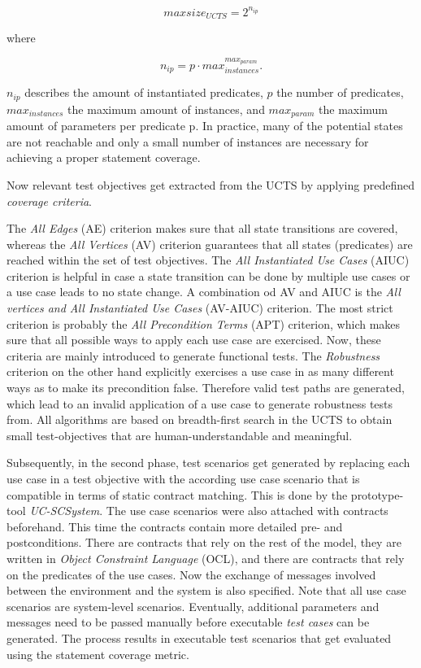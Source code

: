 \begin{equation}
	maxsize_{UCTS} = 2^{n_{ip}}
\end{equation}

where

\begin{equation}
	n_{ip} = p \cdot max_{instances}^{max_{param}}.
\end{equation}

$n_{ip}$ describes the amount of instantiated predicates, $p$ the number of predicates, $max_{instances}$ the maximum amount of instances, and $max_{param}$ the maximum amount of parameters per predicate p. In practice, many of the potential states are not reachable and only a small number of instances are necessary for achieving a proper statement coverage. 

Now relevant test objectives get extracted from the UCTS by applying predefined \textit{coverage criteria}. 

The \textit{All Edges} (AE) criterion makes sure that all state transitions are covered, whereas the \textit{All Vertices} (AV) criterion guarantees that all states (predicates) are reached within the set of test objectives.  The \textit{All Instantiated Use Cases} (AIUC) criterion is helpful in case a state transition can be done by multiple use cases or a use case leads to no state change. A combination od AV and AIUC is the \textit{All vertices and All Instantiated Use Cases} (AV-AIUC) criterion. The most strict criterion is probably the \textit{All Precondition Terms} (APT) criterion, which makes sure that all possible ways to apply each use case are exercised. Now, these criteria are mainly introduced to generate functional tests. The \textit{Robustness} criterion on the other hand explicitly exercises a use case in as many different ways as to make its precondition false. Therefore valid test paths are generated, which lead to an invalid application of a use case to generate robustness tests from. All algorithms are based on breadth-first search in the UCTS to obtain small test-objectives that are human-understandable and meaningful. 

Subsequently, in the second phase, test scenarios get generated by replacing each use case in a test objective with the according use case scenario that is compatible in terms of static contract matching. This is done by the prototype-tool \textit{UC-SCSystem}. The use case scenarios were also attached with contracts beforehand. This time the contracts contain more detailed pre- and postconditions. There are contracts that rely on the rest of the model, they are written in \textit{Object Constraint Language} (OCL), and there are contracts that rely on the predicates of the use cases. Now the exchange of messages involved between the environment and the system is also specified. Note that all use case scenarios are system-level scenarios. Eventually, additional parameters and messages need to be passed manually before executable \textit{test cases} can be generated. The process results in executable test scenarios that get evaluated using the statement coverage metric.

